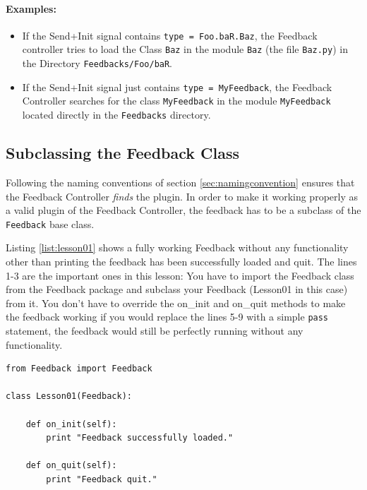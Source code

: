 \paragraph{Examples:}
\begin{itemize}
\item If the Send+Init signal contains \lstinline+type = Foo.baR.Baz+, the Feedback controller tries to load the Class \lstinline+Baz+ in the module \verb+Baz+ (the file \verb+Baz.py+) in the Directory \verb+Feedbacks/Foo/baR+.
\item If the Send+Init signal just contains \lstinline+type = MyFeedback+, the Feedback Controller searches for the class \lstinline+MyFeedback+ in the module \verb+MyFeedback+ located directly in the \verb+Feedbacks+ directory.
\end{itemize}


\subsection{Subclassing the Feedback Class}
Following the naming conventions of section \ref{sec:namingconvention} ensures that the Feedback Controller \textit{finds} the plugin. In order to make it working properly as a valid plugin of the Feedback Controller, the feedback has to be a subclass of the \lstinline+Feedback+ base class.

Listing \ref{list:lesson01} shows a fully working Feedback without any functionality other than printing the feedback has been successfully loaded and quit. The lines 1-3 are the important ones in this lesson: You have to import the Feedback class from the Feedback package and subclass your Feedback (Lesson01 in this case) from it. You don't have to override the on\_init and on\_quit methods to make the feedback working if you would replace the lines 5-9 with a simple \lstinline+pass+ statement, the feedback would still be perfectly running without any functionality.

\begin{lstlisting}[caption=Trivial Feedback, label={list:lesson01}]
from Feedback import Feedback

class Lesson01(Feedback):
    
    def on_init(self):
        print "Feedback successfully loaded."
    
    def on_quit(self):
        print "Feedback quit."
\end{lstlisting}

